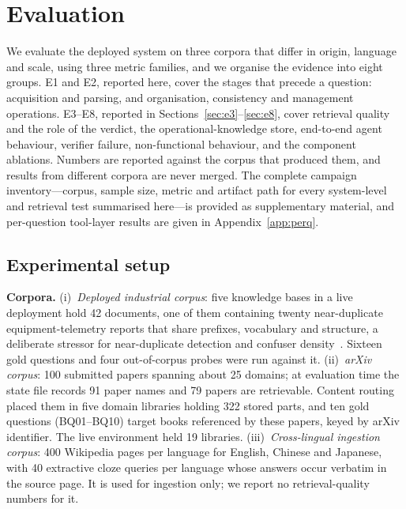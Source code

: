 \section{Evaluation}
\label{sec:eval}

We evaluate the deployed system on three corpora that differ in origin, language and scale, using three metric families, and we organise the evidence into eight groups. E1 and E2, reported here, cover the stages that precede a question: acquisition and parsing, and organisation, consistency and management operations. E3--E8, reported in Sections~\ref{sec:e3}--\ref{sec:e8}, cover retrieval quality and the role of the verdict, the operational-knowledge store, end-to-end agent behaviour, verifier failure, non-functional behaviour, and the component ablations. Numbers are reported against the corpus that produced them, and results from different corpora are never merged. The complete campaign inventory---corpus, sample size, metric and artifact path for every system-level and retrieval test summarised here---is provided as supplementary material, and per-question tool-layer results are given in Appendix~\ref{app:perq}.

\subsection{Experimental setup}
\label{sec:eval-setup}

\textbf{Corpora.} (i)~\emph{Deployed industrial corpus}: five knowledge bases in a live deployment hold 42 documents, one of them containing twenty near-duplicate equipment-telemetry reports that share prefixes, vocabulary and structure, a deliberate stressor for near-duplicate detection and confuser density~\cite{manku-near-dup-2007}. Sixteen gold questions and four out-of-corpus probes were run against it. (ii)~\emph{arXiv corpus}: 100 submitted papers spanning about 25 domains; at evaluation time the state file records 91 paper names and 79 papers are retrievable. Content routing placed them in five domain libraries holding 322 stored parts, and ten gold questions (BQ01--BQ10) target books referenced by these papers, keyed by arXiv identifier. The live environment held 19 libraries. (iii)~\emph{Cross-lingual ingestion corpus}: 400 Wikipedia pages per language for English, Chinese and Japanese, with 40 extractive cloze queries per language whose answers occur verbatim in the source page. It is used for ingestion only; we report no retrieval-quality numbers for it.

